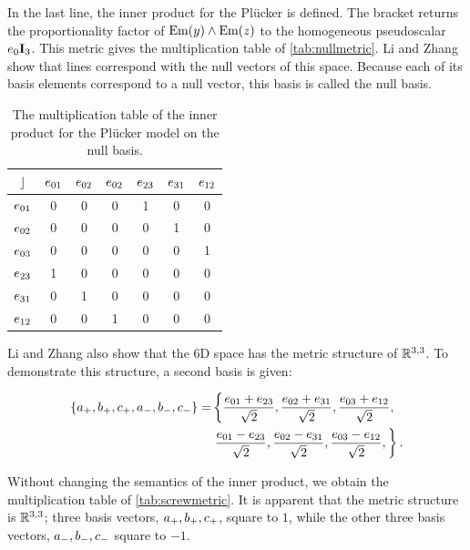 In the last line, the inner product for the Pl\"ucker is defined.  The bracket returns the proportionality factor of $\operatorname{Em}(y) \wedge \operatorname{Em}(z)$ to the homogeneous pseudoscalar $e_0\mathbf{I}_3$.  This metric gives the multiplication table of \autoref{tab:nullmetric}.  Li and Zhang show that lines correspond with the null vectors of this space.  Because each of its basis elements correspond to a null vector, this basis is called the null basis. 

\begin{table}
  \caption{The multiplication table of the inner product for the Pl\"ucker model on the null basis.}
  \label{tab:nullmetric}
  \begin{center}
    \begin{tabular}{|c||c|c|c|c|c|c|}
      \hline
      $\mathbin{\rfloor}$ & $e_{01}$ & $e_{02}$ & $e_{02}$ & $e_{23}$ & $e_{31}$ & $e_{12}$ \\
      \hline \hline
      $e_{01}$ & 0 & 0 & 0 & 1 & 0 & 0 \\
      \hline
      $e_{02}$ & 0 & 0 & 0 & 0 & 1 & 0 \\
      \hline
      $e_{03}$ & 0 & 0 & 0 & 0 & 0 & 1 \\
      \hline
      $e_{23}$ & 1 & 0 & 0 & 0 & 0 & 0 \\
      \hline
      $e_{31}$ & 0 & 1 & 0 & 0 & 0 & 0 \\
      \hline
      $e_{12}$ & 0 & 0 & 1 & 0 & 0 & 0 \\
      \hline
    \end{tabular}
  \end{center}
\end{table}

Li and Zhang also show that the 6D space has the metric structure of $\mathbb{R}^{3,3}$.  To demonstrate this structure, a second basis is given:

\begin{equation*}
  \begin{split}
  \left\{a_{+}, b_{+}, c_{+}, a_{-}, b_{-}, c_{-}\right\} =
    & \left\{ \frac{e_{01} + e_{23}}{\sqrt{2}}, \frac{e_{02} + e_{31}}{\sqrt{2}}, \frac{e_{03} + e_{12}}{\sqrt{2}}, \right.\\
    & \left.  \frac{e_{01} - e_{23}}{\sqrt{2}}, \frac{e_{02} - e_{31}}{\sqrt{2}}, \frac{e_{03} - e_{12}}{\sqrt{2}}, \right\}
.
\end{split}
\end{equation*}

Without changing the semantics of the inner product, we obtain the multiplication table of \autoref{tab:screwmetric}.  It is apparent that the metric structure is $\mathbb{R}^{3,3}$; three basis vectors, $a_{+}, b_{+}, c_{+}$, square to $1$, while the other three basis vectors, $a_{-}, b_{-}, c_{-}$ square to $-1$.  

